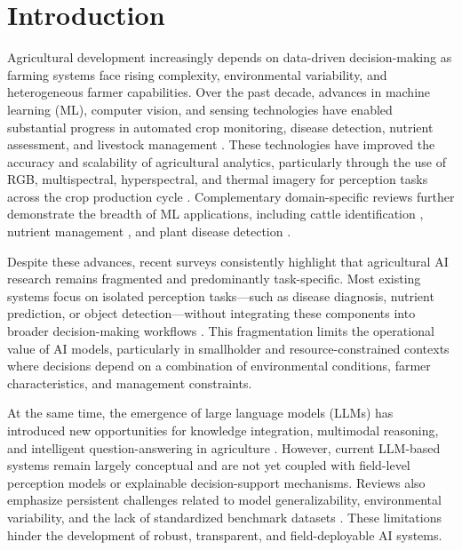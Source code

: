 \documentclass[3p,twocolumn,authoryear]{elsarticle}
\begin{document}

\section{Introduction}

Agricultural development increasingly depends on data-driven
decision-making as farming systems face rising complexity, environmental
variability, and heterogeneous farmer capabilities.
Over the past decade, advances in machine learning (ML), computer vision,
and sensing technologies have enabled substantial progress in automated
crop monitoring, disease detection, nutrient assessment, and livestock
management \citep{kamilaris2018,liakos2018,ghazal2024survey,yang2025}.
These technologies have improved the accuracy and scalability of
agricultural analytics, particularly through the use of RGB,
multispectral, hyperspectral, and thermal imagery for perception tasks
across the crop production cycle \citep{ghazal2024survey}.
Complementary domain-specific reviews further demonstrate the breadth
of ML applications, including cattle identification
\citep{hossain2022cattle}, nutrient management \citep{ennaji2023nutrient},
and plant disease detection \citep{omaye2024disease}.

Despite these advances, recent surveys consistently highlight that
agricultural AI research remains fragmented and predominantly
task-specific.
Most existing systems focus on isolated perception tasks---such as disease
diagnosis, nutrient prediction, or object detection---without integrating
these components into broader decision-making workflows
\citep{ghazal2024survey,omaye2024disease}.
This fragmentation limits the operational value of AI models,
particularly in smallholder and resource-constrained contexts where
decisions depend on a combination of environmental conditions, farmer
characteristics, and management constraints.

At the same time, the emergence of large language models (LLMs) has
introduced new opportunities for knowledge integration, multimodal
reasoning, and intelligent question-answering in agriculture
\citep{li2025llm}.
However, current LLM-based systems remain largely conceptual and are not
yet coupled with field-level perception models or explainable
decision-support mechanisms.
Reviews also emphasize persistent challenges related to model
generalizability, environmental variability, and the lack of standardized
benchmark datasets \citep{hossain2022cattle,ennaji2023nutrient}.
These limitations hinder the development of robust, transparent, and
field-deployable AI systems.
\end{document}
